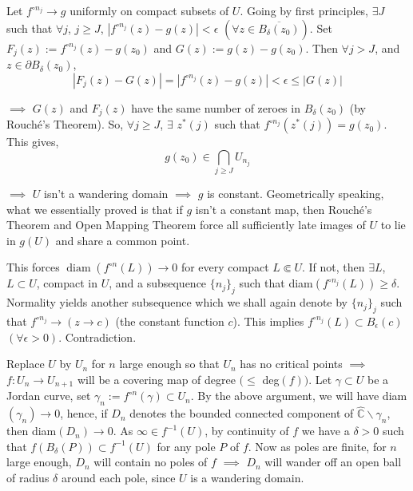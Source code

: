 \documentclass[11pt,a4paper]{article}
\begin{document}
        Let $f^{\circ n_j}\rightarrow g$ uniformly on compact subsets of $U$. Going by first principles, $\exists J$ such that $\forall j$, $j\geq J$, $|f^{\circ n_j}(z)-g(z)| < \epsilon$ $(\forall z \in \overline{B_{\delta}(z_0)})$. Set $F_j(z):= f^{\circ n_j}(z)-g(z_0)$ and $G(z):= g(z)-g(z_0)$. Then $\forall j > J$, and $z\in \partial B_{\delta}(z_0)$,
        $$|F_j(z) -G(z)| = |f^{\circ n_j}(z)-g(z)|<\epsilon \leq |G(z)|$$

        $\implies$ $G(z)$ and $F_j(z)$ have the same number of zeroes in $B_{\delta}(z_0)$ (by Rouch\'e's Theorem). So, $\forall j \geq J$, $\exists$ $z^*(j)$ such that $f^{\circ n_j}(z^*(j)) = g(z_0)$. This gives,
        $$g(z_0) \in \bigcap_{j\geq J}{U_{n_j}}$$

        $\implies$ $U$ isn't a wandering domain $\implies$ $g$ is constant. Geometrically speaking, what we essentially proved is that if $g$ isn't a constant map, then Rouch\'e's Theorem and Open Mapping Theorem force all sufficiently late images of $U$ to lie in $g(U)$ and share a common point.

        This forces $\operatorname{diam}(f^{\circ n}(L)) \rightarrow 0$ for every compact $L\Subset U$. If not, then $\exists L$, $L \subset U$, compact in $U$, and a subsequence $\{n_j\}_j$ such that diam$(f^{\circ n_j}(L)) \geq \delta$. Normality yields another subsequence which we shall again denote by $\{n_j\}_j$ such that $f^{\circ n_j} \rightarrow (z\rightarrow c)$ (the constant function $c$). This implies $f^{\circ n_j}(L) \subset B_{\epsilon}(c)$ $(\forall \epsilon >0)$. Contradiction.

        Replace $U$ by $U_n$ for $n$ large enough so that $U_n$ has no critical points $\implies$ $f:U_n \rightarrow U_{n+1}$ will be a covering map of degree $(\leq $ deg$(f))$. Let $\gamma \subset U$ be a Jordan curve, set $\gamma_n:= f^{\circ n}(\gamma) \subset U_n$. By the above argument, we will have diam$(\gamma_n) \rightarrow 0$, hence, if $D_n$ denotes the bounded connected component of $\hat{\mathbb{C}}\backslash \gamma_n$, then diam$(D_n) \rightarrow 0$. As $\infty \in f^{-1}(U)$, by continuity of $f$ we have a $\delta >0$ such that $f(B_{\delta}(P)) \subset f^{-1}(U)$ for any pole $P$ of $f$. Now as poles are finite, for $n$ large enough, $D_n$ will contain no poles of $f$ $\implies$ $D_n$ will wander off an open ball of radius $\delta$ around each pole, since $U$ is a wandering domain.
\end{document}
